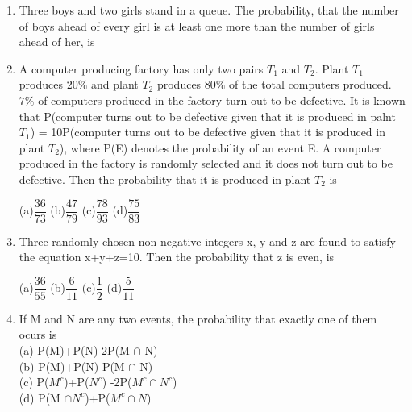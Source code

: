 \documentclass[journal,12pt,twocolumn]{IEEEtran}
\begin{document}
\begin{enumerate}[label=\arabic*]
	\begin{multicols}{4}
	(a)$\dfrac{91}{216}$  (b)$\dfrac{108}{216}$ (c)$\dfrac{125}{216}$  (d)$\dfrac{127}{216}$
	\end{multicols}
	\item Three boys and two girls stand in a queue. The probability, that the number of boys ahead of every girl is at least one more than the number of girls ahead of her, is
	\begin{itemize}
	\begin{multicols}{4}
	\item[(a)]$\dfrac{1}{2}$  \item[(b)]$\dfrac{1}{3}$  \item[(c)]$\dfrac{2}{3}$  \item[(d)]$\dfrac{3}{4}$
	\end{multicols}
	\end{itemize}
	\item A computer producing factory has only two pairs $T_1$ and $T_2$. Plant $T_1$ produces $20\%$ and plant $T_2$ produces $80\%$ of the total computers produced. $7\%$ of computers produced in the factory turn out to be defective. It is known that P(computer turns out to be defective given that it is produced in palnt $T_1$) = 10P(computer turns out to be defective given that it is produced in plant $T_2$), where P(E) denotes the probability of an event E. A computer produced in the factory is randomly selected and it does not turn out to be defective. Then the probability that it is produced in plant $T_2$ is
	\begin{multicols}{4}
	(a)$\dfrac{36}{73}$ 	(b)$\dfrac{47}{79}$     (c)$\dfrac{78}{93}$  (d)$\dfrac{75}{83}$
	\end{multicols}
	\item Three randomly chosen non-negative integers x, y and z are found to satisfy the equation x+y+z=10. Then the probability that z is even, is
	\begin{multicols}{4}
	(a)$\dfrac{36}{55}$  (b)$\dfrac{6}{11}$  (c)$\dfrac{1}{2}$  (d)$\dfrac{5}{11}$
	\end{multicols}
	\item If M and N are any two events, the probability that exactly one of them ocurs is\\
	(a) P(M)+P(N)-2P(M $\cap$ N)\\
	(b) P(M)+P(N)-P(M $\cap$ N)\\
	(c) P($M^{c}$)+P($N^{c}$) -2P($M^{c} \cap N^{c}$)\\
	(d) P(M $\cap N^{c}$)+P($M^{c} \cap N$)\\

\end{enumerate}
\end{document}
